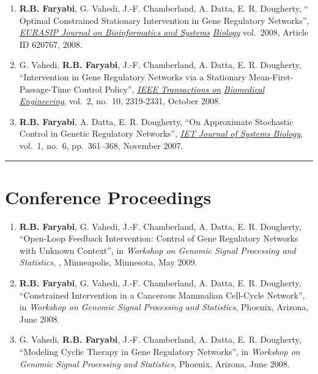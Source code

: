 \documentclass[12pt, centered, centered]{res_yy}
\begin{document}
\begin{resume}
\begin{enumerate}
\item {\bf {R.B. Faryabi}}, G. Vahedi, J.-F. Chamberland, A. Datta, E. R. Dougherty, 
`` Optimal Constrained Stationary Intervention in Gene Regulatory Networks'', \underline{{\emph{EURASIP Journal on Bioinformatics and Systems}}} \underline{{\emph{Biology}}} vol.~2008, Article ID 620767, 2008.

\item G. Vahedi, {\bf {R.B. Faryabi}}, J.-F. Chamberland, A. Datta, E. R. Dougherty, 
``Intervention in Gene Regulatory Networks via a Stationary Mean-First-Passage-Time Control Policy'', \underline{{\emph{IEEE Transactions on}}} \underline{{\emph{Biomedical Engineering}}}, vol.~2, no.~10, 2319-2331, October 2008.

\item {\bf {R.B. Faryabi}}, A. Datta, E. R. Dougherty, 
``On Approximate Stochastic Control in Genetic Regulatory Networks'', \underline{{\emph{IET Journal of Systems Biology}}}, 
vol.~1, no.~6, pp.~361--368, November 2007.

\end{enumerate}

\vspace{-.1in}
\rule{\linewidth}{0.05mm}


\section{\sc Conference Proceedings}
\begin{enumerate}

\item {\bf {R.B. Faryabi}}, G. Vahedi, J.-F. Chamberland, A. Datta, E. R. Dougherty, 
``Open-Loop Feedback Intervention: Control of Gene Regulatory Networks with Unknown Context'',  in \emph{Workshop on Genomic Signal Processing and Statistics}, 
, Minneapolis, Minnesota, May 2009.

\item {\bf {R.B. Faryabi}}, G. Vahedi, J.-F. Chamberland, A. Datta, E. R. Dougherty, 
``Constrained Intervention in a Cancerous Mammalian Cell-Cycle Network'',  
in \emph{Workshop on Genomic Signal Processing and Statistics}, 
Phoenix, Arizona, June 2008.

\item G. Vahedi, {\bf {R.B. Faryabi}}, J.-F. Chamberland, A. Datta, E. R. Dougherty, 
``Modeling Cyclic Therapy in Gene Regulatory Networks'',  
in \emph{Workshop on Genomic Signal Processing and Statistics}, 
Phoenix, Arizona, June 2008.


\end{enumerate}
\end{resume}
\end{document}
